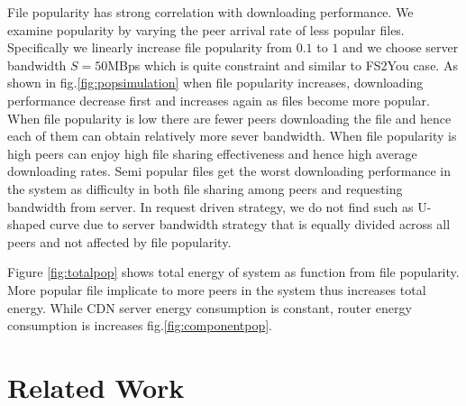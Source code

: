 \documentclass[conference]{IEEEtran}
\begin{document}
File popularity has strong correlation with downloading performance. 
We examine popularity by varying the peer arrival rate of less popular files.
Specifically we linearly increase file popularity from $0.1$ to $1$ and we choose server bandwidth $S=50$MBps which is quite constraint and similar to FS2You case.
As shown in fig.\ref{fig:popsimulation} when file popularity increases, downloading performance decrease first and increases again as files become more popular.
When file popularity is low there are fewer peers downloading the file and hence each of them can obtain relatively more sever bandwidth.
When file popularity is high peers can enjoy high file sharing effectiveness and hence high average downloading rates.
Semi popular files get the worst downloading performance in the system as difficulty in both file sharing among peers and requesting bandwidth from server.
In request driven strategy, we do not find such as U-shaped curve due to server bandwidth strategy that is equally divided across all peers and not affected by file popularity.

Figure \ref{fig:totalpop} shows total energy of system as function from file popularity.  
More popular file implicate to more peers in the system thus increases total energy.  
While CDN server energy consumption is constant, router energy consumption is increases fig.\ref{fig:componentpop}. 



\section{Related Work} 
\end{document}
